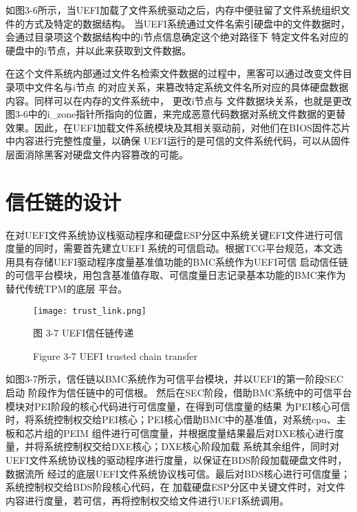 如图3-6所示，当UEFI加载了文件系统驱动之后，内存中便驻留了文件系统组织文件的方式及特定的数据结构。
当UEFI系统通过文件名索引硬盘中的文件数据时，会通过目录项这个数据结构中的i节点信息确定这个绝对路径下
特定文件名对应的硬盘中的i节点，并以此来获取到文件数据。
\par 在这个文件系统内部通过文件名检索文件数据的过程中，黑客可以通过改变文件目录项中文件名与i节点
的对应关系，来篡改特定系统文件名所对应的具体硬盘数据内容\cite{chinese15}。同样可以在内存的文件系统中，
更改i节点与
文件数据块关系，也就是更改图3-6中的i\_zone指针所指向的位置，来完成恶意代码数据对系统文件数据的更替
效果。因此，在UEFI加载文件系统模块及其相关驱动前，对他们在BIOS固件芯片中内容进行完整性度量，以确保
UEFI运行的是可信的文件系统代码，可以从固件层面消除黑客对硬盘文件内容篡改的可能。

%
%
\section{信任链的设计}
在对UEFI文件系统协议栈驱动程序和硬盘ESP分区中系统关键EFI文件进行可信度量的同时，需要首先建立UEFI
系统的可信启动。根据TCG平台规范，本文选用具有存储UEFI驱动程序度量基准值功能的BMC系统作为UEFI可信
启动信任链的可信平台模块\cite{chinese5}，用包含基准值存取、可信度量日志记录基本功能的BMC来作为替代传统TPM的底层
平台\cite{chinese25}。

\begin{figure}[htb]
    \label{ffs_format}
    \vspace{0cm}   
    \setlength{\abovecaptionskip}{0.3cm}
	\centering
    \texttt{[image: trust\_link.png]}
    \caption*{图 3-7 UEFI信任链传递}
    \setlength{\belowcaptionskip}{-0.7cm}
    \caption*{Figure 3-7 UEFI trusted chain transfer}
\end{figure}

如图3-7所示，信任链以BMC系统作为可信平台模块\cite{chinese27,chinese28}，并以UEFI的第一阶段SEC启动
阶段作为信任链中的可信根\cite{chinese6}。
然后在SEC阶段，借助BMC系统中的可信平台模块对PEI阶段的核心代码进行可信度量，在得到可信度量的结果
为PEI核心可信时，将系统控制权交给PEI核心；PEI核心借助BMC中的基准值，对系统cpu、主板和芯片组的PEIM
组件进行可信度量，并根据度量结果最后对DXE核心进行度量，并将系统控制权交给DXE核心；DXE核心阶段加载
系统其余组件，同时对UEFI文件系统协议栈的驱动程序进行度量，以保证在BDS阶段加载硬盘文件时，数据流所
经过的底层UEFI文件系统协议栈可信。最后对BDS核心进行可信度量；系统控制权交给BDS阶段核心代码，在
加载硬盘ESP分区中关键文件时，对文件内容进行度量，若可信，再将控制权交给文件进行UEFI系统调用\cite{chinese12}。

